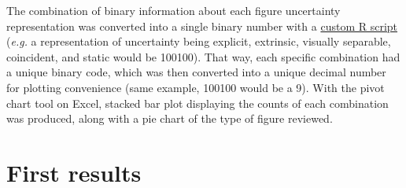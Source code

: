 \documentclass[12pt,a4paper]{article}
\begin{document}
The combination of binary information about each figure uncertainty representation was converted into a single binary number with a \href{https://github.com/AdrianBach/Workshop\textunderscore task/blob/master/bin2dec\textunderscore script.R}{custom R script} (\textit{e.g.} a representation of uncertainty being explicit, extrinsic, visually separable, coincident, and static would be 100100).
That way, each specific combination had a unique binary code, which was then converted into a unique decimal number for plotting convenience (same example, 100100 would be a 9).%
With the pivot chart tool on Excel, stacked bar plot displaying the counts of each combination was produced, along with a pie chart of the type of figure reviewed.

\section{First results}
\end{document}
